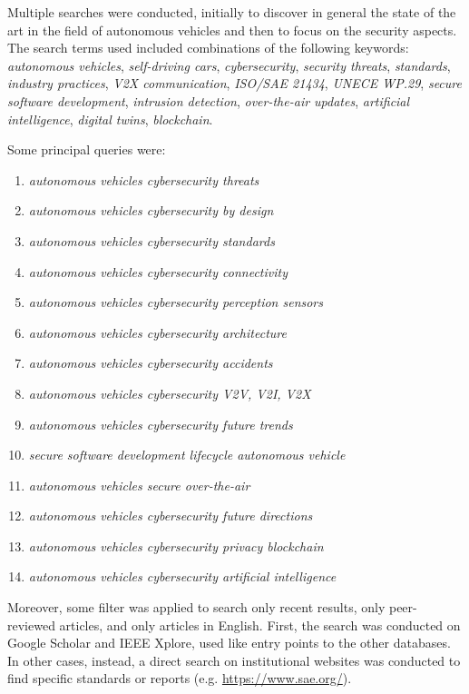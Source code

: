 Multiple searches were conducted, initially to discover in general the state of the art in the field of autonomous vehicles and then to focus on the security aspects.
The search terms used included combinations of the following keywords:
\textit{autonomous vehicles},
\textit{self-driving cars},
\textit{cybersecurity},
\textit{security threats},
\textit{standards},
\textit{industry practices},
\textit{V2X communication},
\textit{ISO/SAE 21434},
\textit{UNECE WP.29},
\textit{secure software development},
\textit{intrusion detection},
\textit{over-the-air updates},
\textit{artificial intelligence},
\textit{digital twins},
\textit{blockchain}.

Some principal queries were:
\begin{enumerate}
    \item \textit{autonomous vehicles cybersecurity threats}
    \item \textit{autonomous vehicles cybersecurity by design}
    \item \textit{autonomous vehicles cybersecurity standards}
    \item \textit{autonomous vehicles cybersecurity connectivity}
    \item \textit{autonomous vehicles cybersecurity perception sensors}
    \item \textit{autonomous vehicles cybersecurity architecture}
    \item \textit{autonomous vehicles cybersecurity accidents}
    \item \textit{autonomous vehicles cybersecurity V2V, V2I, V2X}
    \item \textit{autonomous vehicles cybersecurity future trends}
    \item \textit{secure software development lifecycle autonomous vehicle}
    \item \textit{autonomous vehicles secure over-the-air}
    \item \textit{autonomous vehicles cybersecurity future directions}
    \item \textit{autonomous vehicles cybersecurity privacy blockchain}
    \item \textit{autonomous vehicles cybersecurity artificial intelligence}
\end{enumerate}

Moreover, some filter was applied to search only recent results, only peer-reviewed articles, and only articles in English.
First, the search was conducted on Google Scholar and IEEE Xplore, used like entry points to the other databases.
In other cases, instead, a direct search on institutional websites was conducted to find specific standards or reports (e.g. \url{https://www.sae.org/}).

